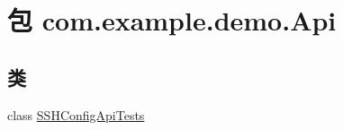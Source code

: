 \hypertarget{namespacecom_1_1example_1_1demo_1_1_api}{}\section{包 com.\+example.\+demo.\+Api}
\label{namespacecom_1_1example_1_1demo_1_1_api}
\subsection*{类}
\begin{DoxyCompactItemize}
\item 
class \mbox{\hyperlink{classcom_1_1example_1_1demo_1_1_api_1_1_s_s_h_config_api_tests}{S\+S\+H\+Config\+Api\+Tests}}
\end{DoxyCompactItemize}
